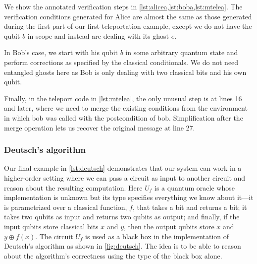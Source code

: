 \documentclass[adraft,creativecommons]{eptcs}
\theoremstyle{definition}
\theoremstyle{remark}
\begin{document}






We show the annotated verification steps in \cref{lst:alicea,lst:boba,lst:mtelea}. The verification conditions generated for Alice are almost the same as those generated during the first part of our first teleportation example, except we do not have the qubit $b$ in scope and instead are dealing with its ghost $e$.

In Bob's case, we start with his qubit $b$ in some arbitrary quantum state and perform corrections as specified by the classical conditionals. We do not need entangled ghosts here as Bob is only dealing with two classical bits and his own qubit.

Finally, in the teleport code in \cref{lst:mtelea}, the only unusual step is at lines 16 and later, where we need to merge the existing conditions from the environment in which bob was called with the postcondition of bob. Simplification after the merge operation lets us recover the original message at line 27.

\subsubsection{Deutsch's algorithm}

Our final example in \cref{lst:deutsch} demonstrates that our system can work in a higher-order setting where we can pass a circuit as input to another circuit and reason about the resulting computation. Here $U_f$ is a quantum oracle whose implementation is unknown but its type specifies everything we know about it---it is parametrized over a classical function, $f$, that takes a bit and returns a bit; it takes two qubits as input and returns two qubits as output; and finally, if the input qubits store classical bits $x$ and $y$, then the output qubits store $x$ and $y \oplus f(x)$. The circuit $U_f$ is used as a black box in the implementation of Deutsch's algorithm as shown in \cref{fig:deutsch}. The idea is to be able to reason about the algorithm's correctness using the type of the black box alone.
\end{document}
